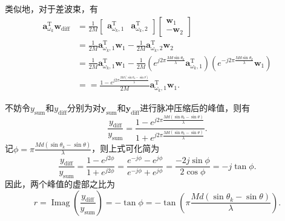 类似地，对于差波束，有
\[
    \begin{split}
        \bm{a}_{\omega_k}^{\mathrm{T}} \bm{w}_{\text{diff}} & = \frac{1}{2M}\begin{bmatrix}
                                                                                \bm{a}_{\omega_k,1}^{\mathrm{T}} & \bm{a}_{\omega_k,2}^{\mathrm{T}}
                                                                            \end{bmatrix}
        \begin{bmatrix}
            \bm{w}_1 \\
            -\bm{w}_2
        \end{bmatrix}                                                                                                                                                                                                                                                                                     \\
                                                            & = \frac{1}{2M} \bm{a}_{\omega_k,1}^{\mathrm{T}} \bm{w}_1 - \frac{1}{2M} \bm{a}_{\omega_k,2}^{\mathrm{T}} \bm{w}_2                                                                                                                            \\
                                                            & = \frac{1}{2M} \bm{a}_{\omega_k,1}^{\mathrm{T}} \bm{w}_1 - \frac{1}{2M} \left( e^{j 2 \pi \frac{M d \sin \theta_k}{\lambda}} \bm{a}_{\omega_k,1}^{\mathrm{T}} \right) \left( e^{-j 2 \pi \frac{M d \sin \theta_k}{\lambda}} \bm{w}_1 \right) \\
                                                            & = = \frac{1 - e^{j 2\pi \frac{M d (\sin \theta_k - \sin \theta)}{\lambda}}}{2M} \bm{a}_{\omega_k,1}^{\mathrm{T}} \bm{w}_1.
    \end{split}
\]

不妨令\( y_{\text{sum}} \)和\( y_{\text{diff}} \)分别为对\( \bm{y}_{\text{sum}} \)和\( \bm{y}_{\text{diff}} \)进行脉冲压缩后的峰值，则有
\[
    \frac{y_{\text{diff}}}{y_{\text{sum}}} = \frac{1 - e^{j 2\pi \frac{M d (\sin \theta_k - \sin \theta)}{\lambda}}}{1 + e^{j 2\pi \frac{M d (\sin \theta_k - \sin \theta)}{\lambda}}}.
\]
记\( \phi = \pi \frac{M d (\sin \theta_k - \sin \theta)}{\lambda} \)，则上式可化简为
\[
    \frac{y_{\text{diff}}}{y_{\text{sum}}} = \frac{1 - e^{j 2 \phi}}{1 + e^{j 2 \phi}} = \frac{e^{-j \phi} - e^{j \phi}}{e^{-j \phi} + e^{j \phi}} = \frac{-2j \sin \phi}{2 \cos \phi} =-j \tan \phi.
\]
因此，两个峰值的虚部之比为
\[
    r = \operatorname{Imag}\left( \frac{y_{\text{diff}}}{y_{\text{sum}}} \right) = - \tan \phi = - \tan \left( \pi \frac{M d (\sin \theta_k - \sin \theta)}{\lambda} \right).
\]

